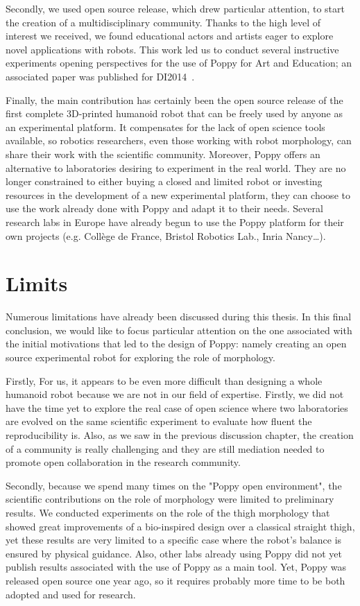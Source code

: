 Secondly, we used open source release, which drew particular attention, to start the creation of a multidisciplinary community. Thanks to the high level of interest we received, we found educational actors and artists eager to explore novel applications with robots. This work led us to conduct several instructive experiments opening perspectives for the use of Poppy for Art and Education; an associated paper was published for DI2014~\parencite{lapeyreDI}.

Finally, the main contribution has certainly been the open source release of the first complete 3D-printed humanoid robot that can be freely used by anyone as an experimental platform. It compensates for the lack of open science tools available, so robotics researchers, even those working with robot morphology, can share their work with the scientific community. Moreover, Poppy offers an alternative to laboratories desiring to experiment in the real world. They are no longer constrained to either buying a closed and limited robot or investing resources in the development of a new experimental platform, they can choose to use the work already done with Poppy and adapt it to their needs.
Several research labs in Europe have already begun to use the Poppy platform for their own projects (e.g. Collège de France, Bristol Robotics Lab., Inria Nancy…).


\section{Limits} %

Numerous limitations have already been discussed during this thesis. In this final conclusion, we would like to focus particular attention on the one associated with the initial motivations that led to the design of Poppy: namely creating an open source experimental robot for exploring the role of morphology.

Firstly,  For us, it appears to be even more difficult than designing a whole humanoid robot because we are not in our field of expertise.
Firstly, we did not have the time yet to explore the real case of open science where two laboratories are evolved on the same scientific experiment to evaluate how fluent the reproducibility is. Also, as we saw in the previous discussion chapter, the creation of a community is really challenging and they are still mediation needed to promote open collaboration in the research community.

Secondly, because we spend many times on the "Poppy open environment", the scientific contributions on the role of morphology were limited to preliminary results. We conducted experiments on the role of the thigh morphology that showed great improvements of a bio-inspired design over a classical straight thigh, yet these results are very limited to a specific case where the robot’s balance is ensured by physical guidance. Also, other labs already using Poppy did not yet publish results associated with the use of Poppy as a main tool. Yet, Poppy was released open source one year ago, so it requires probably more time to be both adopted and used for research.


